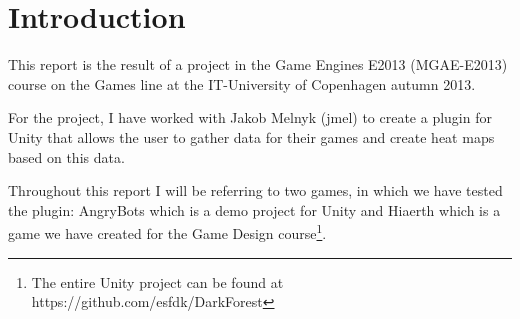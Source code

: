 \section{Introduction}
\label{01}

This report is the result of a project in the Game Engines E2013 (MGAE-E2013) course on the Games line at the IT-University of Copenhagen autumn 2013. 

For the project, I have worked with Jakob Melnyk (jmel) to create a plugin for Unity that allows the user to gather data for their games and create heat maps based on this data.

Throughout this report I will be referring to two games, in which we have tested the plugin: AngryBots which is a demo project for Unity and Hiaerth which is a game we have created for the Game Design course\footnote{The entire Unity project can be found at https://github.com/esfdk/DarkForest}.


